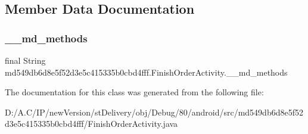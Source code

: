 \subsection{Member Data Documentation}
\mbox{\label{classmd549db6d8e5f52d3e5c415335b0cbd4fff_1_1_finish_order_activity_ae5bde3a1f470c6a8e254696dd691a82e}} 
\subsubsection{\texorpdfstring{\+\_\+\+\_\+md\+\_\+methods}{\_\_md\_methods}}
{\footnotesize\ttfamily final String md549db6d8e5f52d3e5c415335b0cbd4fff.\+Finish\+Order\+Activity.\+\_\+\+\_\+md\+\_\+methods\hspace{0.3cm}{\ttfamily [static]}}



The documentation for this class was generated from the following file\+:\begin{DoxyCompactItemize}
\item 
D\+:/\+A.\+C/\+I\+P/new\+Version/st\+Delivery/obj/\+Debug/80/android/src/md549db6d8e5f52d3e5c415335b0cbd4fff/Finish\+Order\+Activity.\+java\end{DoxyCompactItemize}
